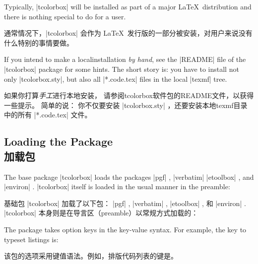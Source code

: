 Typically, |tcolorbox| will be installed as part of a major \LaTeX\ distribution
and there is nothing special to do for a user.

通常情况下，|tcolorbox| 会作为%
\LaTeX\ 发行版的一部分被安装，对用户来说没有什么特别的事情要做。

If you intend to make a localinstallation \emph{by hand}, %
see the |README| file of the |tcolorbox| package for some hints. %
The short story is: you have to install not only |tcolorbox.sty|, %
but also all |*.code.tex| files in the local |texmf| tree.

如果你打算\emph{手工}进行本地安装，%
请参阅tcolorbox软件包的README文件，以获得一些提示。%
简单的说： 你不仅要安装 |tcolorbox.sty| ，还要安装本地texmf目录中的所有 |*.code.tex| 文件。

\subsection{Loading the Package\\加载包}


The base package |tcolorbox| loads the packages
|pgf| %
, |verbatim| %
|etoolbox| %
, and |environ| %
.
|tcolorbox| itself is loaded in the usual manner in the preamble:

基础包 |tcolorbox| 加载了以下包：
|pgf| ,%
|verbatim| ,%
|etoolbox| ,%
和 |environ| .%
% 
|tcolorbox| 本身则是在导言区（preamble）以常规方式加载的：


\begin{dispListing}
\usepackage{tcolorbox}
\end{dispListing}


The package takes option keys in the key-value syntax.%
For example, the key to typeset listings is:

该包的选项采用键值语法。例如，排版代码列表的键是。


